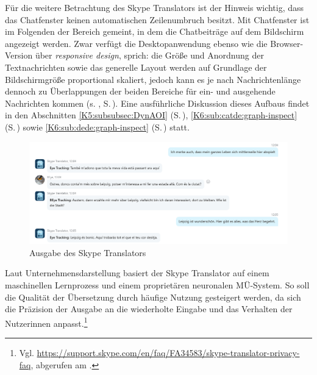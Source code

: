 
Für die weitere Betrachtung des Skype Translators ist der Hinweis wichtig, dass das Chatfenster keinen automatischen Zeilenumbruch besitzt. Mit Chatfenster ist im Folgenden der Bereich gemeint, in dem die Chatbeiträge auf dem Bildschirm angezeigt werden. Zwar verfügt die Desktopanwendung ebenso wie die Browser-Version über \emph{responsive design}, sprich: die Größe und Anordnung der Textnachrichten sowie das generelle Layout werden auf Grundlage der Bildschirmgröße proportional skaliert, jedoch kann es je nach Nachrichtenlänge dennoch zu Überlappungen der beiden Bereiche für ein- und ausgehende Nachrichten kommen (s. , S.\,\pageref{K3:fig:Ausschnitt-Ausgabe-MT-ST}). Eine ausführliche Diskussion dieses Aufbaus findet in den Abschnitten \ref{K5:subsubsec:DynAOI} (S.\,\pageref{K5:subsubsec:DynAOI}), \ref{K6:sub:catde:graph-inspect} (S.\,\pageref{K6:sub:catde:graph-inspect}) sowie \ref{K6:sub:dede:graph-inspect} (S.\,\pageref{K6:sub:dede:graph-inspect}) statt.


\begin{figure}
    \includegraphics[width=\textwidth]{Figures/Skype/output_ST-ausschnitt.png}
    \caption{Ausgabe des Skype Translators\label{K3:fig:Ausschnitt-Ausgabe-MT-ST}}
\end{figure}


Laut Unternehmensdarstellung basiert der Skype Translator auf einem maschinellen Lernprozess und einem proprietären neuronalen MÜ-System. So soll die Qualität der Übersetzung durch häufige Nutzung gesteigert werden, da sich die Präzision der Ausgabe an die wiederholte Eingabe und das Verhalten der Nutzer{\textperiodcentered}innen anpasst.\footnote{Vgl. \url{https://support.skype.com/en/faq/FA34583/skype-translator-privacy-faq}, abgerufen am \datum{}.}

